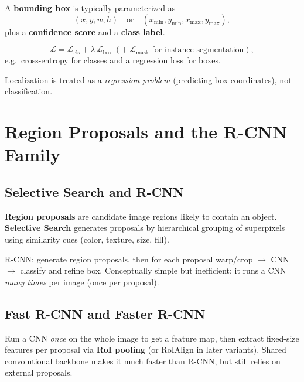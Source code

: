 \documentclass[11pt, oneside]{book}
\begin{document}
\begin{thmbox}[title={Reprojection Error Minimization}]
\begin{defbox}[title={Correlation and Convolution}]
\begin{defbox}[title={ReLU and Pooling}]
\begin{defbox}[title={Segmentation}]
\begin{defbox}[title={Graph-Based Segmentation}]
\begin{defbox}[title={U-Net}]
\begin{defbox}[title={Bounding Box}]
A \textbf{bounding box} is typically parameterized as
\[
(x, y, w, h) \quad \text{or} \quad (x_{\min}, y_{\min}, x_{\max}, y_{\max}),
\]
plus a \textbf{confidence score} and a \textbf{class label}.
\end{defbox}

\begin{thmbox}[title={Multi-Task Detection Loss}]
\[
\mathcal{L} = \mathcal{L}_{\text{cls}} + \lambda\,\mathcal{L}_{\text{box}} \ (+\ \mathcal{L}_{\text{mask}} \text{ for instance segmentation}),
\]
e.g.\ cross-entropy for classes and a regression loss for boxes.
\end{thmbox}

Localization is treated as a \emph{regression problem} (predicting box coordinates), not classification.

\section{Region Proposals and the R-CNN Family}

\subsection{Selective Search and R-CNN}

\begin{defbox}[title={Region Proposals}]
\textbf{Region proposals} are candidate image regions likely to contain an object.
\textbf{Selective Search} generates proposals by hierarchical grouping of superpixels using similarity cues
(color, texture, size, fill).
\end{defbox}

R-CNN: generate region proposals, then for each proposal warp/crop $\rightarrow$ CNN $\rightarrow$ classify and refine box.
Conceptually simple but inefficient: it runs a CNN \emph{many times} per image (once per proposal).

\subsection{Fast R-CNN and Faster R-CNN}

\begin{defbox}[title={Fast R-CNN}]
Run a CNN \emph{once} on the whole image to get a feature map, then extract fixed-size features per proposal via
\textbf{RoI pooling} (or RoIAlign in later variants).
Shared convolutional backbone makes it much faster than R-CNN, but still relies on external proposals.
\end{defbox}


\end{defbox}
\end{defbox}
\end{defbox}
\end{defbox}
\end{defbox}
\end{thmbox}
\end{document}
